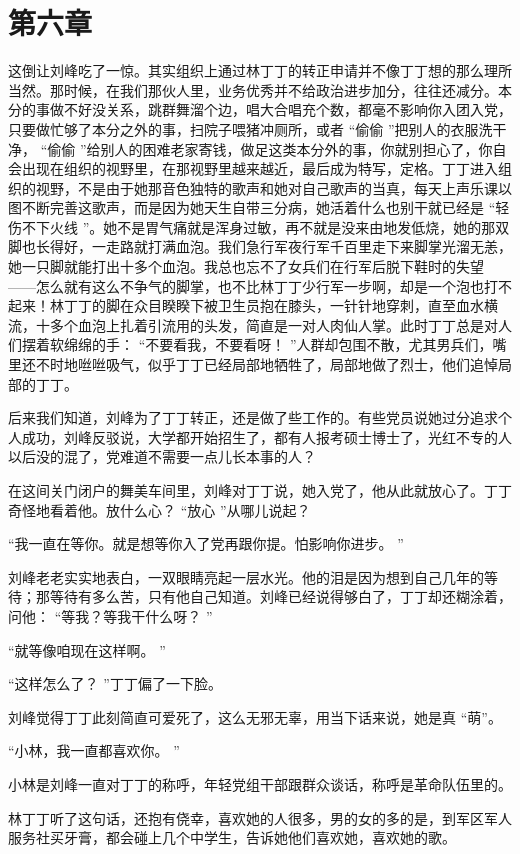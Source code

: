 \documentclass[12pt,twoside,openany]{book}
\begin{document}
\chapter{第六章}

这倒让刘峰吃了一惊。其实组织上通过林丁丁的转正申请并不像丁丁想的那么理所当然。那时候，在我们那伙人里，业务优秀并不给政治进步加分，往往还减分。本分的事做不好没关系，跳群舞溜个边，唱大合唱充个数，都毫不影响你入团入党，只要做忙够了本分之外的事，扫院子喂猪冲厕所，或者 “偷偷 ”把别人的衣服洗干净， “偷偷 ”给别人的困难老家寄钱，做足这类本分外的事，你就别担心了，你自会出现在组织的视野里，在那视野里越来越近，最后成为特写，定格。丁丁进入组织的视野，不是由于她那音色独特的歌声和她对自己歌声的当真，每天上声乐课以图不断完善这歌声，而是因为她天生自带三分病，她活着什么也别干就已经是 “轻伤不下火线 ”。她不是胃气痛就是浑身过敏，再不就是没来由地发低烧，她的那双脚也长得好，一走路就打满血泡。我们急行军夜行军千百里走下来脚掌光溜无恙，她一只脚就能打出十多个血泡。我总也忘不了女兵们在行军后脱下鞋时的失望 ——怎么就有这么不争气的脚掌，也不比林丁丁少行军一步啊，却是一个泡也打不起来！林丁丁的脚在众目睽睽下被卫生员抱在膝头，一针针地穿刺，直至血水横流，十多个血泡上扎着引流用的头发，简直是一对人肉仙人掌。此时丁丁总是对人们摆着软绵绵的手： “不要看我，不要看呀！ ”人群却包围不散，尤其男兵们，嘴里还不时地咝咝吸气，似乎丁丁已经局部地牺牲了，局部地做了烈士，他们追悼局部的丁丁。

后来我们知道，刘峰为了丁丁转正，还是做了些工作的。有些党员说她过分追求个人成功，刘峰反驳说，大学都开始招生了，都有人报考硕士博士了，光红不专的人以后没的混了，党难道不需要一点儿长本事的人？

在这间关门闭户的舞美车间里，刘峰对丁丁说，她入党了，他从此就放心了。丁丁奇怪地看着他。放什么心？ “放心 ”从哪儿说起？

“我一直在等你。就是想等你入了党再跟你提。怕影响你进步。 ”

刘峰老老实实地表白，一双眼睛亮起一层水光。他的泪是因为想到自己几年的等待；那等待有多么苦，只有他自己知道。刘峰已经说得够白了，丁丁却还糊涂着，问他： “等我？等我干什么呀？ ”

“就等像咱现在这样啊。 ”

“这样怎么了？ ”丁丁偏了一下脸。

刘峰觉得丁丁此刻简直可爱死了，这么无邪无辜，用当下话来说，她是真 “萌”。

“小林，我一直都喜欢你。 ”

小林是刘峰一直对丁丁的称呼，年轻党组干部跟群众谈话，称呼是革命队伍里的。

林丁丁听了这句话，还抱有侥幸，喜欢她的人很多，男的女的多的是，到军区军人服务社买牙膏，都会碰上几个中学生，告诉她他们喜欢她，喜欢她的歌。
\end{document}

